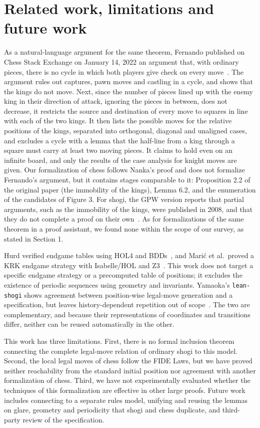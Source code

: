\documentclass[a4paper,11pt]{article}
\newcommand{\code}[1]{{\small\nolinkurl{#1}}}
\theoremstyle{definition}
\begin{document}
\section{Related work, limitations and future work}\label{sec:related}
As a natural-language argument for the same theorem, Fernando published on Chess Stack Exchange on January 14, 2022 an argument that, with ordinary pieces, there is no cycle in which both players give check on every move~\cite{fernando}.
The argument rules out captures, pawn moves and castling in a cycle, and shows that the kings do not move.
Next, since the number of pieces lined up with the enemy king in their direction of attack, ignoring the pieces in between, does not decrease, it restricts the source and destination of every move to squares in line with each of the two kings.
It then lists the possible moves for the relative positions of the kings, separated into orthogonal, diagonal and unaligned cases, and excludes a cycle with a lemma that the half-line from a king through a square must carry at least two moving pieces.
It claims to hold even on an infinite board, and only the results of the case analysis for knight moves are given.
Our formalization of chess follows Nanka's proof and does not formalize Fernando's argument, but it contains stages comparable to it: Proposition 2.2 of the original paper (the immobility of the kings), Lemma 6.2, and the enumeration of the candidates of Figure 3.
For shogi, the GPW version reports that partial arguments, such as the immobility of the kings, were published in 2008, and that they do not complete a proof on their own~\cite{gpw}.
As for formalizations of the same theorem in a proof assistant, we found none within the scope of our survey, as stated in Section 1.

Hurd verified endgame tables using HOL4 and BDDs~\cite{hurd}, and Marić et al.\ proved a KRK endgame strategy with Isabelle/HOL and Z3~\cite{krk}.
This work does not target a specific endgame strategy or a precomputed table of positions; it excludes the existence of periodic sequences using geometry and invariants.
Yamaoka's \code{lean-shogi} shows agreement between position-wise legal-move generation and a specification, but leaves history-dependent repetition out of scope~\cite{yam}.
The two are complementary, and because their representations of coordinates and transitions differ, neither can be reused automatically in the other.

This work has three limitations.
First, there is no formal inclusion theorem connecting the complete legal-move relation of ordinary shogi to this model.
Second, the local legal moves of chess follow the FIDE Laws, but we have proved neither reachability from the standard initial position nor agreement with another formalization of chess.
Third, we have not experimentally evaluated whether the techniques of this formalization are effective in other large proofs.
Future work includes connecting to a separate rules model, unifying and reusing the lemmas on glare, geometry and periodicity that shogi and chess duplicate, and third-party review of the specification.
\end{document}
